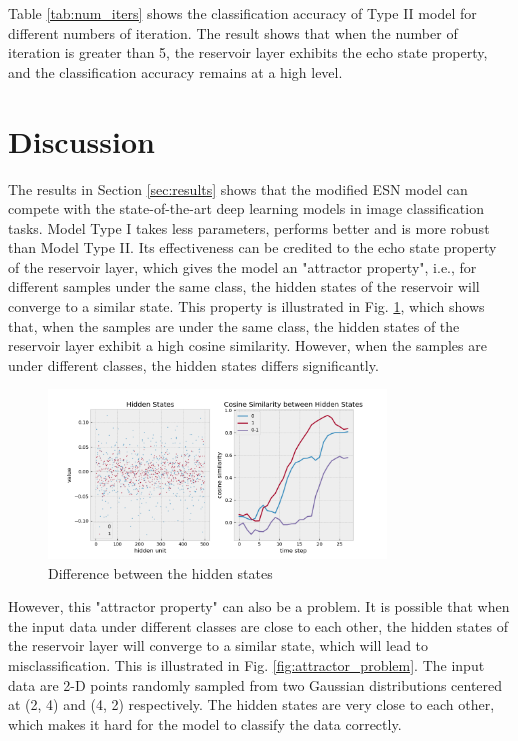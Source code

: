 \documentclass{article}
\begin{document}
Table \ref{tab:num_iters} shows the classification accuracy of Type II model for different numbers of iteration.
The result shows that when the number of iteration is greater than 5, the reservoir layer exhibits the echo state property,
and the classification accuracy remains at a high level.


\section{Discussion}

The results in Section \ref{sec:results} shows that the modified ESN model can compete with the state-of-the-art deep learning models
in image classification tasks. Model Type I takes less parameters, performs better and is more robust than Model Type II. 
Its effectiveness can be credited to the echo state property of the reservoir layer, which gives the model
an "attractor property", i.e., for different samples under the same class, the hidden states of the reservoir will converge to a similar state.
This property is illustrated in Fig. \ref{fig:cosine_similarity}, which shows that, when the samples are under the same class, 
the hidden states of the reservoir layer exhibit a high cosine similarity. However, when the samples are under different classes, the hidden states 
differs significantly.


\begin{figure}[htbp]
    \centering
    \includegraphics[width=0.8\textwidth]{assets/cosine_similarity.png}
    \caption{Difference between the hidden states}
    \label{fig:cosine_similarity}
\end{figure}


However, this "attractor property" can also be a problem. It is possible that when the input data under different classes are close to each other, 
the hidden states of the reservoir layer will converge to a similar state, which will lead to misclassification. 
This is illustrated in Fig. \ref{fig:attractor_problem}. The input data are 2-D points randomly sampled from two Gaussian distributions centered 
at (2, 4) and (4, 2) respectively. The hidden states are very close to each other, which makes it hard for the model to classify the data correctly.
\end{document}
